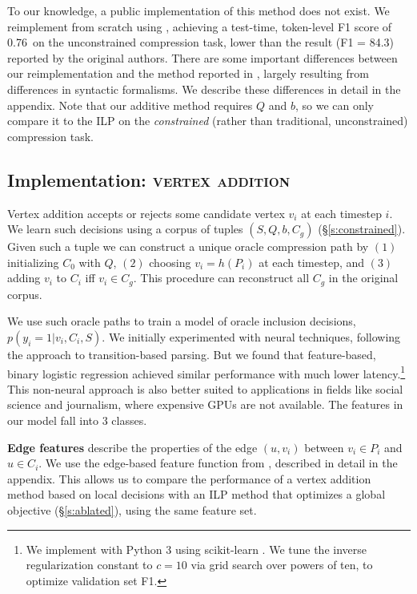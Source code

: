 \documentclass[11pt,a4paper]{article}
\newcommand{\ilptest}[0]{0.76~}
\begin{document}
To our knowledge, a public implementation of this method does not exist. We reimplement from scratch using \citet{gurobi}, achieving a test-time, token-level F1 score of \ilptest on the unconstrained compression task, lower than the result {\small (F1 = 84.3)} reported by the original authors. There are some important differences between our reimplementation and the method reported in \citet{filippova2013overcoming}, largely resulting from differences in syntactic formalisms. We describe these differences in detail in the appendix. Note that our additive method requires $Q$ and $b$, so we can only compare it to the ILP on the \textit{constrained} (rather than traditional, unconstrained) compression task.

\subsection{Implementation: \textsc{vertex addition}}\label{s:transition}

Vertex addition accepts or rejects some candidate vertex $v_i$ at each timestep $i$. 
We learn such decisions using a corpus of tuples $(S,Q,b,C_g)$ (\S\ref{s:constrained}). Given such a tuple we can construct a unique oracle compression path by $(1)$ initializing $C_0$ with $Q$, $(2)$ choosing $v_i = h(P_i)$ at each timestep, and $(3)$ adding $v_i$ to $C_i$ iff $v_i \in C_g$. This procedure can reconstruct all $C_g$ in the original \citet{filippova2013overcoming} corpus. 

We use such oracle paths to train a model of oracle inclusion decisions, ${p(y_i  = 1 | v_i, C_i, S)}$. We initially experimented with neural techniques, following the \citet{D14-1082} approach to transition-based parsing. But we found that feature-based, binary logistic regression achieved similar performance with much lower latency.\footnote{We implement with Python 3 using scikit-learn \cite{Pedregosa:2011:SML:1953048.2078195}. We tune the inverse regularization constant to $c=10$ via grid search over powers of ten, to optimize validation set F1.} This non-neural approach is also better suited to applications in fields like social science and journalism, where expensive GPUs are not available. The features in our model fall into 3 classes.

\textbf{Edge features} describe the properties of the edge $(u,v_i)$ between $v_i \in P_i$ and $u \in C_i$. We use the edge-based feature function from \citet{filippova2013overcoming}, described in detail in the appendix. This allows us to compare the performance of a vertex addition method based on local decisions with an ILP method that optimizes a global objective (\S \ref{s:ablated}), using the same feature set.
\end{document}
